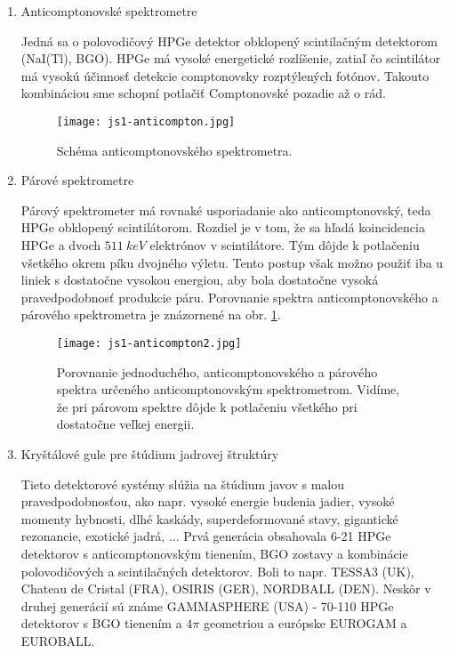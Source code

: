 \documentclass[../../main.tex]{subfiles}
\begin{document}
\begin{enumerate}
\item Anticomptonovské spektrometre

Jedná sa o polovodičový HPGe detektor obklopený scintilačným detektorom (NaI(Tl), BGO). HPGe má vysoké energetické rozlíšenie, zatiaľ čo scintilátor má vysokú účinnosť detekcie comptonovsky rozptýlených fotónov. Takouto kombináciou sme schopní potlačiť Comptonovské pozadie až o rád. 

\begin{figure}[h]
\centering
\texttt{[image: js1-anticompton.jpg]}
\caption{Schéma anticomptonovského spektrometra.}
\end{figure}

\item Párové spektrometre

Párový spektrometer má rovnaké usporiadanie ako anticomptonovský, teda HPGe obklopený scintilátorom. Rozdiel je v tom, že sa hľadá koincidencia HPGe a dvoch $511\:\unit{keV}$ elektrónov v scintilátore. Tým dôjde k potlačeniu všetkého okrem píku dvojného výletu. Tento postup však možno použiť iba u liniek s dostatočne vysokou energiou, aby bola dostatočne vysoká pravedpodobnosť produkcie páru. Porovnanie spektra anticomptonovského a párového spektrometra je znázornené na obr. \ref{js1:img:parovy}.

\begin{figure}[h]
\centering
\texttt{[image: js1-anticompton2.jpg]}
\caption{Porovnanie jednoduchého, anticomptonovského a párového spektra určeného anticomptonovským spektrometrom. Vidíme, že pri párovom spektre dôjde k potlačeniu všetkého pri dostatočne veľkej energii.}
\label{js1:img:parovy}
\end{figure}

\item Kryštálové gule pre štúdium jadrovej štruktúry

Tieto detektorové systémy slúžia na štúdium javov s malou pravedpodobnosťou, ako napr. vysoké energie budenia jadier, vysoké momenty hybnosti, dlhé kaskády, superdeformované stavy, gigantické rezonancie, exotické jadrá, ... Prvá generácia obsahovala 6-21 HPGe detektorov s anticomptonovským tienením, BGO zostavy a kombinácie polovodičových a scintilačných detektorov. Boli to napr. TESSA3 (UK), Chateau de Cristal (FRA), OSIRIS (GER), NORDBALL (DEN). Neskôr v druhej generácií sú známe GAMMASPHERE (USA) - 70-110 HPGe detektorov s BGO tienením a $4\pi$ geometriou a európske EUROGAM a EUROBALL.


\end{enumerate}
\end{document}

